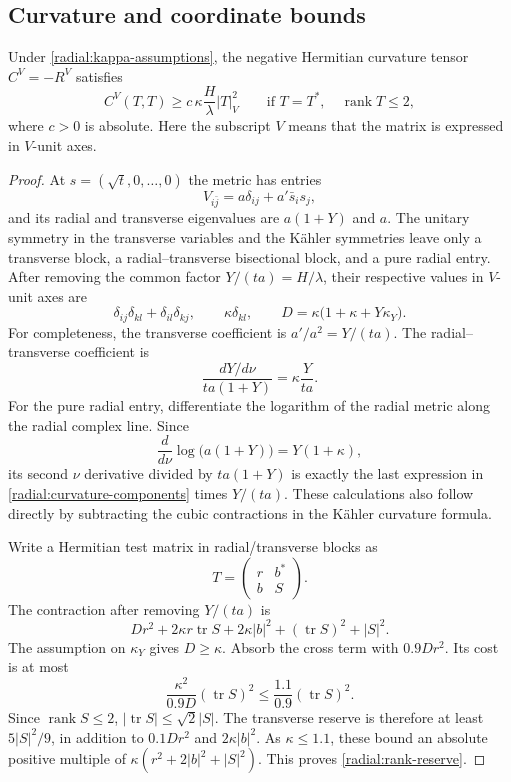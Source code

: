 \subsection{Curvature and coordinate bounds}

\begin{lemma}\label{radial:curvature}
Under \eqref{radial:kappa-assumptions}, the negative Hermitian curvature tensor $C^V=-R^V$ satisfies
\begin{equation}\label{radial:rank-reserve}
 C^V(T,T)\ge c\,\kappa\frac{H}{\lambda}|T|_V^2
 \qquad\text{if }T=T^*,\quad\operatorname{rank}T\le2,
\end{equation}
where $c>0$ is absolute. Here the subscript $V$ means that the matrix is expressed in $V$-unit axes.
\end{lemma}

\begin{proof}
At $s=(\sqrt t,0,\ldots,0)$ the metric has entries
\[
 V_{i\bar j}=a\delta_{ij}+a'\bar s_i s_j,
\]
and its radial and transverse eigenvalues are $a(1+Y)$ and $a$. The unitary symmetry in the transverse variables and the K\"ahler symmetries leave only a transverse block, a radial--transverse bisectional block, and a pure radial entry. After removing the common factor $Y/(ta)=H/\lambda$, their respective values in $V$-unit axes are
\begin{equation}\label{radial:curvature-components}
 \delta_{ij}\delta_{kl}+\delta_{il}\delta_{kj},\qquad
 \kappa\delta_{kl},\qquad
 D=\kappa\bigl(1+\kappa+Y\kappa_Y\bigr).
\end{equation}
For completeness, the transverse coefficient is $a'/a^2=Y/(ta)$. The radial--transverse coefficient is
\[
 \frac{dY/d\nu}{t a(1+Y)}=\kappa\frac{Y}{ta}.
\]
For the pure radial entry, differentiate the logarithm of the radial metric along the radial complex line. Since
\[
 \frac{d}{d\nu}\log\bigl(a(1+Y)\bigr)=Y(1+\kappa),
\]
its second $\nu$ derivative divided by $ta(1+Y)$ is exactly the last expression in \eqref{radial:curvature-components} times $Y/(ta)$. These calculations also follow directly by subtracting the cubic contractions in the K\"ahler curvature formula.

Write a Hermitian test matrix in radial/transverse blocks as
\[
 T=\begin{pmatrix}r&b^*\\ b&S\end{pmatrix}.
\]
The contraction after removing $Y/(ta)$ is
\[
 Dr^2+2\kappa r\operatorname{tr}S+2\kappa|b|^2
       +(\operatorname{tr}S)^2+|S|^2.
\]
The assumption on $\kappa_Y$ gives $D\ge\kappa$. Absorb the cross term with $0.9Dr^2$. Its cost is at most
\[
 \frac{\kappa^2}{0.9D}(\operatorname{tr}S)^2
 \le\frac{1.1}{0.9}(\operatorname{tr}S)^2.
\]
Since $\operatorname{rank}S\le2$, $|\operatorname{tr}S|\le\sqrt2|S|$. The transverse reserve is therefore at least $5|S|^2/9$, in addition to $0.1Dr^2$ and $2\kappa|b|^2$. As $\kappa\le1.1$, these bound an absolute positive multiple of $\kappa(r^2+2|b|^2+|S|^2)$. This proves \eqref{radial:rank-reserve}.
\end{proof}

